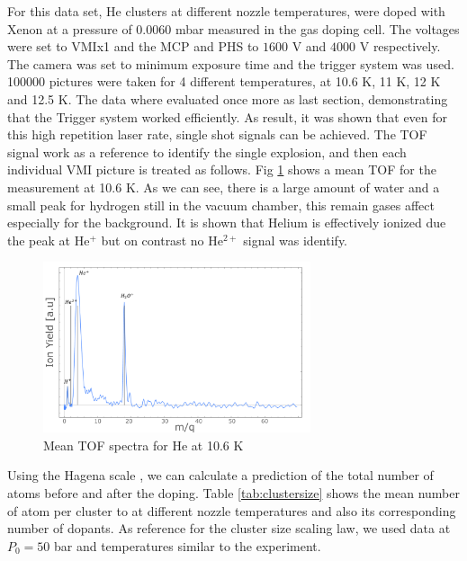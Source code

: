 For this data set, He clusters at different nozzle temperatures, were doped with Xenon at a pressure of $0.0060$ mbar measured in the gas doping cell. The voltages were set to VMIx1  and the MCP and PHS to $1600$ V and $4000$ V respectively. The camera was set to minimum exposure time and the trigger system was used. 100000 pictures were taken for 4 different temperatures, at 10.6 K, 11 K, 12 K and 12.5 K. The data where evaluated once more as last section, demonstrating that the Trigger system worked efficiently. As result, it was shown that even for this high repetition laser rate, single shot signals can be achieved. The TOF signal work as a reference to identify the single explosion, and then each individual VMI picture is treated as follows. Fig \ref{fig:tofhe} shows a mean TOF for the measurement at 10.6 K. As we can see, there is a large amount of water and a small peak for hydrogen still in the vacuum chamber, this remain gases affect especially for the background. It is shown that Helium is effectively ionized due the peak at He$^{+}$ but on contrast no He$^{2+}$ signal was identify.

\begin{figure}[hbtp]
\centering
\includegraphics[width=0.7\textwidth]{../Images/TOF-10k6.png}
\caption[MIR TOF spectra He ]{Mean TOF spectra for He at 10.6 K}
\label{fig:tofhe}
\end{figure}

Using the Hagena scale \cite{hagena_cluster_1972}, we can calculate a prediction of the total number of atoms before and after the doping. Table \ref{tab:clustersize} shows the mean number of atom per cluster to at different nozzle temperatures and also its corresponding number of dopants. As reference for the cluster size scaling law, we used data at $P_{0}=50$ bar and temperatures similar to the experiment. 

